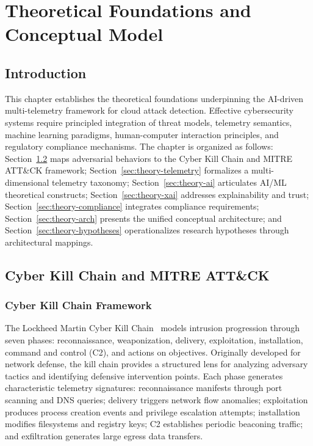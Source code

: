 \chapter{Theoretical Foundations and Conceptual Model}\label{chap:theory}

\section{Introduction}\label{sec:theory-intro}
This chapter establishes the theoretical foundations underpinning the AI-driven multi-telemetry framework for cloud attack detection. Effective cybersecurity systems require principled integration of threat models, telemetry semantics, machine learning paradigms, human-computer interaction principles, and regulatory compliance mechanisms. The chapter is organized as follows: Section~\ref{sec:theory-killchain} maps adversarial behaviors to the Cyber Kill Chain and MITRE ATT\&CK framework; Section~\ref{sec:theory-telemetry} formalizes a multi-dimensional telemetry taxonomy; Section~\ref{sec:theory-ai} articulates AI/ML theoretical constructs; Section~\ref{sec:theory-xai} addresses explainability and trust; Section~\ref{sec:theory-compliance} integrates compliance requirements; Section~\ref{sec:theory-arch} presents the unified conceptual architecture; and Section~\ref{sec:theory-hypotheses} operationalizes research hypotheses through architectural mappings.

\section{Cyber Kill Chain and MITRE ATT\&CK}\label{sec:theory-killchain}
\subsection{Cyber Kill Chain Framework}
The Lockheed Martin Cyber Kill Chain~\cite{hutchins2011killchain} models intrusion progression through seven phases: reconnaissance, weaponization, delivery, exploitation, installation, command and control (C2), and actions on objectives. Originally developed for network defense, the kill chain provides a structured lens for analyzing adversary tactics and identifying defensive intervention points. Each phase generates characteristic telemetry signatures: reconnaissance manifests through port scanning and DNS queries; delivery triggers network flow anomalies; exploitation produces process creation events and privilege escalation attempts; installation modifies filesystems and registry keys; C2 establishes periodic beaconing traffic; and exfiltration generates large egress data transfers.

